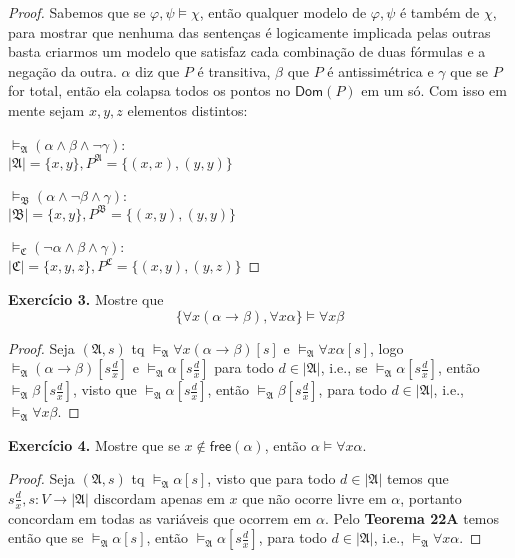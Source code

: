 \documentclass[11pt]{article}
\newcommand{\mf}[1]{\mathfrak{#1}}
\newcommand{\msf}[1]{\mathsf{#1}}
\begin{document}
\begin{proof}
    Sabemos que se $\varphi,\psi\vDash\chi$, então qualquer modelo de $\varphi,\psi$ é também de $\chi$, para mostrar que nenhuma das sentenças é logicamente implicada pelas outras basta criarmos um modelo que satisfaz cada combinação de duas fórmulas e a negação da outra. $\alpha$ diz que $P$ é transitiva, $\beta$ que $P$ é antissimétrica e $\gamma$ que se $P$ for total, então ela colapsa todos os pontos no $\msf{Dom}(P)$ em um só. Com isso em mente sejam $x, y,z$ elementos distintos:
    
    $\vDash_\mf{A}(\alpha\wedge\beta\wedge\neg\gamma)$:\\
    $|\mf{A}|=\{x,y\}, P^\mf{A}=\{(x,x),(y,y)\}$

    $\vDash_\mf{B}(\alpha\wedge\neg\beta\wedge\gamma)$:\\
    $|\mf{B}|=\{x,y\}, P^\mf{B}=\{(x,y),(y,y)\}$

    $\vDash_\mf{C}(\neg\alpha\wedge\beta\wedge\gamma)$:\\
    $|\mf{C}|=\{x,y,z\}, P^\mf{C}=\{(x,y),(y,z)\}$
\end{proof}

\begin{shaded}
\textbf{Exercício 3.} Mostre que
$$\{\forall x(\alpha\to\beta),\forall x\alpha\}\vDash\forall x\beta$$
\end{shaded}

\begin{proof}
    Seja $(\mf{A},s)$ tq $\vDash_\mf{A}\forall x(\alpha\to\beta)[s]$ e $\vDash_\mf{A}\forall x\alpha[s]$, logo $\vDash_\mf{A}(\alpha\to\beta)\left[s\tfrac{d}{x}\right]$ e $\vDash_\mf{A}\alpha\left[s\tfrac{d}{x}\right]$ para todo $d\in|\mf{A}|$, i.e., se $\vDash_\mf{A}\alpha\left[s\tfrac{d}{x}\right]$, então $\vDash_\mf{A}\beta\left[s\frac{d}{x}\right]$, visto que $\vDash_\mf{A}\alpha\left[s\frac{d}{x}\right]$, então $\vDash_\mf{A}\beta\left[s\frac{d}{x}\right]$, para todo $d\in|\mf{A}|$, i.e., $\vDash_\mf{A}\forall x\beta$.
\end{proof}

\begin{shaded}
\textbf{Exercício 4.} Mostre que se $x\notin\msf{free}(\alpha)$, então $\alpha\vDash\forall x\alpha$.
\end{shaded}

\begin{proof}
    Seja $(\mf{A},s)$ tq $\vDash_\mf{A}\alpha[s]$, visto que para todo $d\in|\mf{A}|$ temos que $s\tfrac{d}{x},s:V\to|\mf{A}|$ discordam apenas em $x$ que não ocorre livre em $\alpha$, portanto concordam em todas as variáveis que ocorrem em $\alpha$. Pelo \textbf{Teorema 22A} temos então que se $\vDash_\mf{A}\alpha[s]$, então $\vDash_\mf{A}\alpha\left[s\tfrac{d}{x}\right]$, para todo $d\in|\mf{A}|$, i.e., $\vDash_\mf{A}\forall x\alpha$.
\end{proof}
\end{document}

